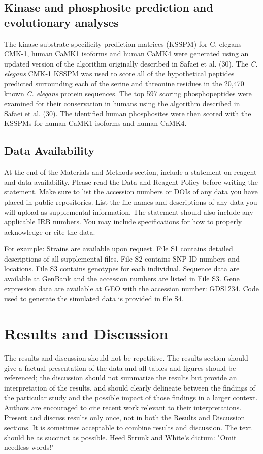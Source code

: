 \documentclass[9pt,twocolumn,twoside]{gsajnl}
\begin{document}
\subsection{Kinase and phosphosite prediction and evolutionary analyses}

The kinase substrate specificity prediction matrices (KSSPM) for C. elegans CMK-1, human CaMK1 isoforms and human CaMK4 were generated using an updated version of the algorithm originally described in Safaei et al. (30). The \textit{C. elegans} CMK-1 KSSPM was used to score all of the hypothetical peptides predicted surrounding each of the serine and threonine residues in the 20,470 known \textit{C. elegans} protein sequences. The top 597 scoring phosphopeptides were examined for their conservation in humans using the algorithm described in Safaei et al. (30). The identified human phosphosites were then scored with the KSSPMs for human CaMK1 isoforms and human CaMK4.

\subsection{Data Availability}

At the end of the Materials and Methods section, include a statement on reagent and data availability. Please read the Data and Reagent Policy before writing the statement. Make sure to list the accession numbers or DOIs of any data you have placed in public repositories. List the file names and descriptions of any data you will upload as supplemental information. The statement should also include any applicable IRB numbers. You may include specifications for how to properly acknowledge or cite the data.

For example: Strains are available upon request. File S1 contains detailed descriptions of all supplemental files. File S2 contains SNP ID numbers and locations. File S3 contains genotypes for each individual. Sequence data are available at GenBank and the accession numbers are listed in File S3. Gene expression data are available at GEO with the accession number: GDS1234. Code used to generate the simulated data is provided in file S4. 


\section{Results and Discussion}

The results and discussion should not be repetitive. The results section should give a factual presentation of the data and all tables and figures should be referenced; the discussion should not summarize the results but provide an interpretation of the results, and should clearly delineate between the findings of the particular study and the possible impact of those findings in a larger context. Authors are encouraged to cite recent work relevant to their interpretations. Present and discuss results only once, not in both the Results and Discussion sections. It is sometimes acceptable to combine results and discussion. The text should be as succinct as possible. Heed Strunk and White's dictum: "Omit needless words!"
\end{document}
